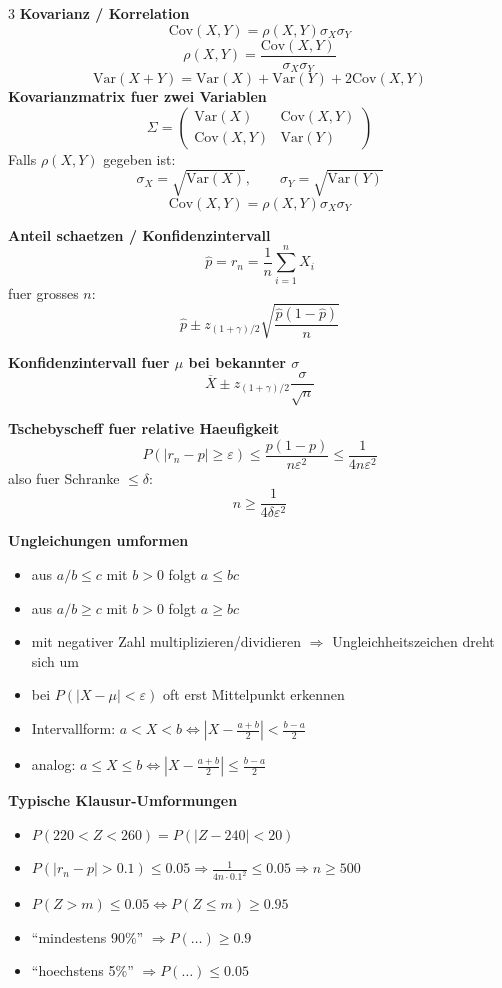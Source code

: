 \documentclass[a4paper,8pt,landscape]{article}
\newcommand{\Var}{\mathrm{Var}}
\newcommand{\Cov}{\mathrm{Cov}}
\begin{document}
\begin{multicols*}{3}
\textbf{Kovarianz / Korrelation}
\[
\Cov(X,Y)=\rho(X,Y)\sigma_X\sigma_Y
\]
\[
\rho(X,Y)=\frac{\Cov(X,Y)}{\sigma_X\sigma_Y}
\]
\[
\Var(X+Y)=\Var(X)+\Var(Y)+2\Cov(X,Y)
\]
\textbf{Kovarianzmatrix fuer zwei Variablen}
\[
\Sigma=
\begin{pmatrix}
\Var(X) & \Cov(X,Y) \\
\Cov(X,Y) & \Var(Y)
\end{pmatrix}
\]
Falls $\rho(X,Y)$ gegeben ist:
\[
\sigma_X=\sqrt{\Var(X)},\qquad \sigma_Y=\sqrt{\Var(Y)}
\]
\[
\Cov(X,Y)=\rho(X,Y)\sigma_X\sigma_Y
\]

\textbf{Anteil schaetzen / Konfidenzintervall}
\[
\hat p=r_n=\frac{1}{n}\sum_{i=1}^n X_i
\]
fuer grosses $n$:
\[
\hat p \pm z_{(1+\gamma)/2}\sqrt{\frac{\hat p(1-\hat p)}{n}}
\]

\textbf{Konfidenzintervall fuer $\mu$ bei bekannter $\sigma$}
\[
\overline X \pm z_{(1+\gamma)/2}\frac{\sigma}{\sqrt n}
\]

\textbf{Tschebyscheff fuer relative Haeufigkeit}
\[
P(|r_n-p|\ge \varepsilon)\le \frac{p(1-p)}{n\varepsilon^2}\le \frac{1}{4n\varepsilon^2}
\]
also fuer Schranke $\le \delta$:
\[
n\ge \frac{1}{4\delta\varepsilon^2}
\]

\textbf{Ungleichungen umformen}
\begin{itemize}
  \item aus $a/b \le c$ mit $b>0$ folgt $a \le bc$
  \item aus $a/b \ge c$ mit $b>0$ folgt $a \ge bc$
  \item mit negativer Zahl multiplizieren/dividieren $\Rightarrow$ Ungleichheitszeichen dreht sich um
  \item bei $P(|X-\mu|<\varepsilon)$ oft erst Mittelpunkt erkennen
  \item Intervallform: $a<X<b \iff |X-\frac{a+b}{2}|<\frac{b-a}{2}$
  \item analog: $a\le X\le b \iff |X-\frac{a+b}{2}|\le \frac{b-a}{2}$
\end{itemize}

\textbf{Typische Klausur-Umformungen}
\begin{itemize}
  \item $P(220<Z<260)=P(|Z-240|<20)$
  \item $P(|r_n-p|>0.1)\le 0.05 \Rightarrow \frac{1}{4n\cdot 0.1^2}\le 0.05 \Rightarrow n\ge 500$
  \item $P(Z>m)\le 0.05 \iff P(Z\le m)\ge 0.95$
  \item ``mindestens 90\%'' $\Rightarrow P(\dots)\ge 0.9$
  \item ``hoechstens 5\%'' $\Rightarrow P(\dots)\le 0.05$
\end{itemize}


\end{multicols*}
\end{document}
